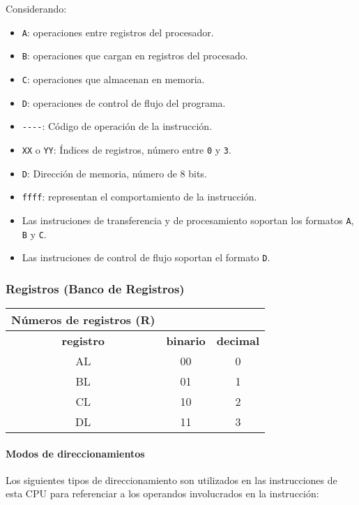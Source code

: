 \documentclass[12pt,twoside]{templates/unerthesis}
\begin{document}
Considerando:

\begin{itemize}
\item
  \texttt{A}: operaciones entre registros del procesador.
\item
  \texttt{B}: operaciones que cargan en registros del procesado.
\item
  \texttt{C}: operaciones que almacenan en memoria.
\item
  \texttt{D}: operaciones de control de flujo del programa.
\item
  \texttt{-\/-\/-\/-}: Código de operación de la instrucción.
\item
  \texttt{XX} o \texttt{YY}: Índices de registros, número entre \texttt{0} y \texttt{3}.
\item
  \texttt{D}: Dirección de memoria, número de 8 bits.
\item
  \texttt{ffff}: representan el comportamiento de la instrucción.
\item
  Las instruciones de transferencia y de procesamiento soportan los formatos \texttt{A}, \texttt{B} y \texttt{C}.
\item
  Las instruciones de control de flujo soportan el formato \texttt{D}.
\end{itemize}

\hypertarget{registros-banco-de-registros}{%
\subsubsection{Registros (Banco de Registros)}\label{registros-banco-de-registros}}

\begin{longtable}[]{@{}ccc@{}}
\toprule
Números de registros (R) & &\tabularnewline
\midrule
\endhead
\textbf{registro} & \textbf{binario} & \textbf{decimal}\tabularnewline
AL & 00 & 0\tabularnewline
BL & 01 & 1\tabularnewline
CL & 10 & 2\tabularnewline
DL & 11 & 3\tabularnewline
\bottomrule
\end{longtable}

\hypertarget{modos-de-direccionamientos}{%
\paragraph{Modos de direccionamientos}\label{modos-de-direccionamientos}}

Los siguientes tipos de direccionamiento son utilizados en las instrucciones de esta CPU para referenciar a los operandos involucrados en la instrucción:
\end{document}
